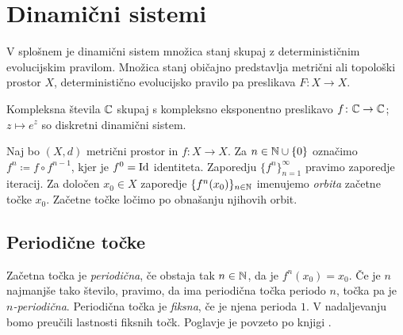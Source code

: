 \section{Dinamični sistemi} \label{sec:dis}

V splošnem je dinamični sistem množica stanj skupaj z determinističnim evolucijskim pravilom. Množica stanj običajno predstavlja metrični ali topološki prostor \(X\), deterministično evolucijsko pravilo pa preslikava \(F \colon X \to X\).




\begin{zgled}
    Kompleksna števila \(\mathbb C\) skupaj s kompleksno eksponentno preslikavo \(f \colon \mathbb C \to \mathbb C\); \(z \mapsto e^{z}\) so diskretni dinamični sistem.
\end{zgled}

\noindent Naj bo \((X, d)\) metrični prostor in \(f \colon X \to X\). Za \(n \in \mathbb N \cup \{0\}\) označimo \(f^n \coloneq f \circ f^{n - 1}\), kjer je \(f^0 = \operatorname{Id}\) identiteta. Zaporedju \(\{f^n\}_{n=1}^{\infty}\) pravimo zaporedje iteracij. Za določen \(x_0 \in X\) zaporedje \(\{f^n (x_0)\}_{n \in \mathbb N}\) imenujemo \emph{orbita} začetne točke \(x_0\). Začetne točke ločimo po obnašanju njihovih orbit.

\subsection{Periodične točke}

Začetna točka je \emph{periodična}, če obstaja tak \(n \in \mathbb N\), da je \(f^n (x_0) = x_0\). Če je \(n\) najmanjše tako število, pravimo, da ima periodična točka periodo \(n\), točka pa je \emph{\(n\)-periodična}. Periodična točka je \emph{fiksna}, če je njena perioda \(\num{1}\). V nadaljevanju bomo preučili lastnosti fiksnih točk. Poglavje je povzeto po knjigi \cite[poglavje 4.]{Pineiro_2025}.

